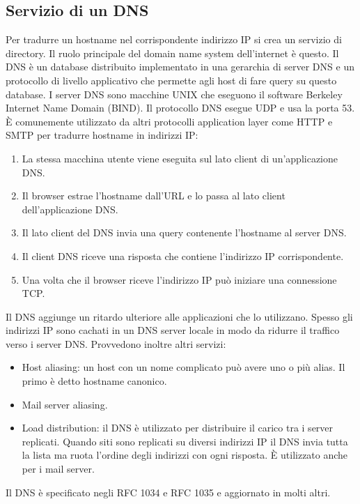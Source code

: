 \subsection{Servizio di un DNS}
Per tradurre un hostname nel corrispondente indirizzo IP si crea un servizio di directory. Il ruolo principale del domain name system dell'internet \`e questo. Il DNS \`e un database distribuito implementato in
una gerarchia di server DNS e un protocollo di livello applicativo che  permette agli host di fare query su questo database. I server DNS sono macchine UNIX che eseguono il software Berkeley Internet Name 
Domain (BIND). Il protocollo DNS esegue UDP e usa la porta 53. \`E comunemente utilizzato da altri protocolli application layer come HTTP e SMTP per tradurre hostname in indirizzi IP:
\begin{enumerate}
\item La stessa macchina utente viene eseguita sul lato client di un'applicazione DNS.
\item Il browser estrae l'hostname dall'URL e lo passa al lato client dell'applicazione DNS.
\item Il lato client del DNS invia una query contenente l'hostname al server DNS.
\item Il client DNS riceve una risposta che contiene l'indirizzo IP corrispondente.
\item Una volta che il browser riceve l'indirizzo IP pu\`o iniziare una connessione TCP.
\end{enumerate}
Il DNS aggiunge un ritardo ulteriore alle applicazioni che lo utilizzano. Spesso gli indirizzi IP sono cachati in un DNS server locale in modo da ridurre il traffico verso i server DNS. Provvedono inoltre altri servizi:
\begin{itemize}
\item Host aliasing: un host con un nome complicato pu\`o avere uno o pi\`u alias. Il primo \`e detto hostname canonico.
\item Mail server aliasing. 
\item Load distribution: il DNS \`e utilizzato per distribuire il carico tra i server replicati. Quando siti sono replicati su diversi indirizzi IP il DNS invia tutta la lista ma ruota l'ordine degli indirizzi con ogni risposta. 
\`E utilizzato anche per i mail server.
\end{itemize}
Il DNS \`e specificato negli RFC 1034 e RFC 1035 e aggiornato in molti altri.
